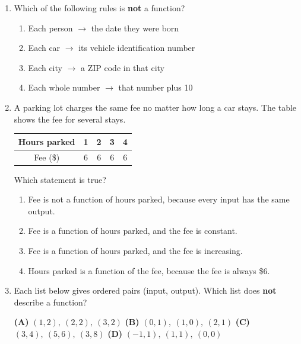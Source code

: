 \documentclass[10pt]{article}
\begin{document}
\begin{enumerate}[leftmargin=1.9em, itemsep=12pt]

\item Which of the following rules is \textbf{not} a function?
      \begin{enumerate}[leftmargin=2.6em, itemsep=2pt]
        \item[(A)] Each person $\to$ the date they were born
        \item[(B)] Each car $\to$ its vehicle identification number
        \item[\textcolor{keyred}{\textbf{$\checkmark$\,(C)}}] Each city $\to$ a ZIP code in that city
        \item[(D)] Each whole number $\to$ that number plus 10
      \end{enumerate}

\item A parking lot charges the same fee no matter how long a car stays. The table shows the
      fee for several stays.

      \begin{center}
      \renewcommand{\arraystretch}{1.3}
      \begin{tabular}{|c|c|c|c|c|}
      \hline
      Hours parked & 1 & 2 & 3 & 4 \\ \hline
      Fee (\$)     & 6 & 6 & 6 & 6 \\ \hline
      \end{tabular}
      \end{center}

      Which statement is true?
      \begin{enumerate}[leftmargin=2.6em, itemsep=2pt]
        \item[(A)] Fee is not a function of hours parked, because every input has the same output.
        \item[\textcolor{keyred}{\textbf{$\checkmark$\,(B)}}] Fee is a function of hours parked, and the fee is constant.
        \item[(C)] Fee is a function of hours parked, and the fee is increasing.
        \item[(D)] Hours parked is a function of the fee, because the fee is always \$6.
      \end{enumerate}

\item Each list below gives ordered pairs (input, output). Which list does \textbf{not} describe a
      function?

      \smallskip
      \textbf{(A)} $(1, 2),\ (2, 2),\ (3, 2)$ \hfill \textbf{(B)} $(0, 1),\ (1, 0),\ (2, 1)$ \hfill
      \textcolor{keyred}{\textbf{(C)}} $(3, 4),\ (5, 6),\ (3, 8)$ \hfill \textbf{(D)} $(-1, 1),\ (1, 1),\ (0, 0)$


\end{enumerate}
\end{document}
